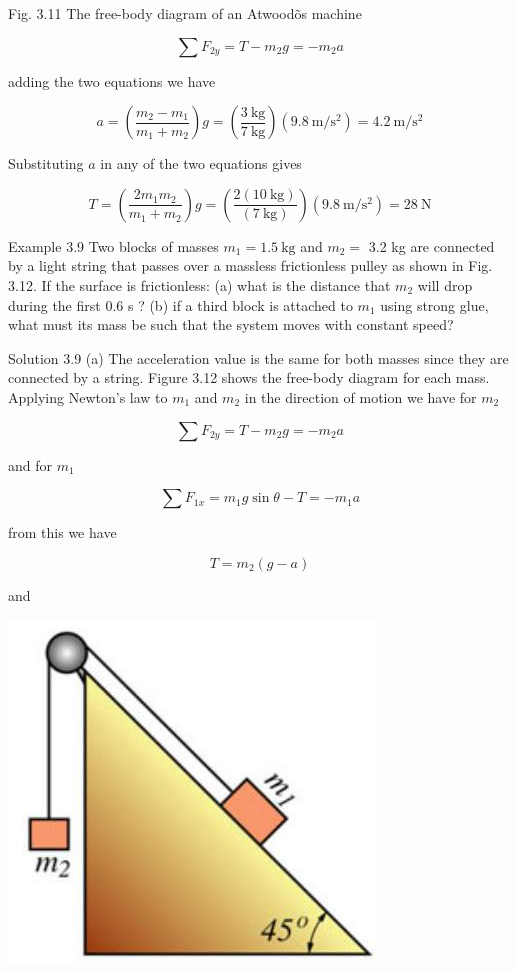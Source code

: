 \documentclass[10pt]{article}
\begin{document}
Fig. 3.11 The free-body diagram of an Atwoodõs machine

$$
\sum F_{2 y}=T-m_{2} g=-m_{2} a
$$

adding the two equations we have

$$
a=\left(\frac{m_{2}-m_{1}}{m_{1}+m_{2}}\right) g=\left(\frac{3 \mathrm{~kg}}{7 \mathrm{~kg}}\right)\left(9.8 \mathrm{~m} / \mathrm{s}^{2}\right)=4.2 \mathrm{~m} / \mathrm{s}^{2}
$$

Substituting $a$ in any of the two equations gives

$$
T=\left(\frac{2 m_{1} m_{2}}{m_{1}+m_{2}}\right) g=\left(\frac{2(10 \mathrm{~kg})}{(7 \mathrm{~kg})}\right)\left(9.8 \mathrm{~m} / \mathrm{s}^{2}\right)=28 \mathrm{~N}
$$

Example 3.9 Two blocks of masses $m_{1}=1.5 \mathrm{~kg}$ and $m_{2}=$ 3.2 kg are connected by a light string that passes over a massless frictionless pulley as shown in Fig. 3.12. If the surface is frictionless: (a) what is the distance that $m_{2}$ will drop during the first 0.6 s ? (b) if a third block is attached to $m_{1}$ using strong glue, what must its mass be such that the system moves with constant speed?

Solution 3.9 (a) The acceleration value is the same for both masses since they are connected by a string. Figure 3.12 shows the free-body diagram for each mass. Applying Newton's law to $m_{1}$ and $m_{2}$ in the direction of motion we have for $m_{2}$

$$
\sum F_{2 y}=T-m_{2} g=-m_{2} a
$$

and for $m_{1}$

$$
\sum F_{1 x}=m_{1} g \sin \theta-T=-m_{1} a
$$

from this we have

$$
T=m_{2}(g-a)
$$

and

\begin{center}
\includegraphics[max width=\textwidth]{2024_09_13_db1f357d2aad0a03eb2eg-056}
\end{center}
\end{document}
